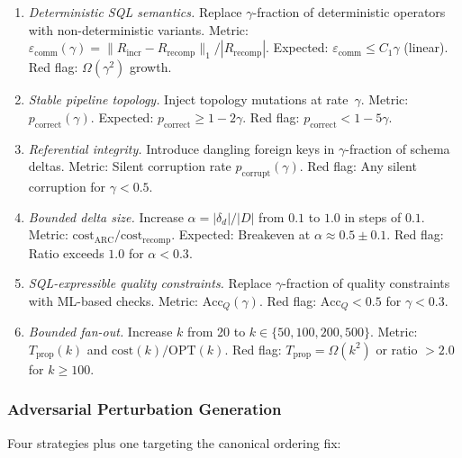 \documentclass[11pt,a4paper]{article}
\theoremstyle{definition}
\newcommand{\cost}{\mathrm{cost}}
\newcommand{\OPT}{\mathrm{OPT}}
\begin{document}
\begin{enumerate}[label=\textbf{A\arabic* ($\gamma$):},leftmargin=*,nosep]
  \item \emph{Deterministic SQL semantics.}
    Replace $\gamma$-fraction of deterministic operators with
    non-deterministic variants.
    Metric: $\varepsilon_{\mathrm{comm}}(\gamma) =
    \|R_{\mathrm{incr}} - R_{\mathrm{recomp}}\|_1 / |R_{\mathrm{recomp}}|$.
    Expected: $\varepsilon_{\mathrm{comm}} \leq C_1 \gamma$ (linear).
    Red flag: $\Omega(\gamma^2)$ growth.

  \item \emph{Stable pipeline topology.}
    Inject topology mutations at rate~$\gamma$.
    Metric: $p_{\mathrm{correct}}(\gamma)$.
    Expected: $p_{\mathrm{correct}} \geq 1 - 2\gamma$.
    Red flag: $p_{\mathrm{correct}} < 1 - 5\gamma$.

  \item \emph{Referential integrity.}
    Introduce dangling foreign keys in $\gamma$-fraction of schema deltas.
    Metric: Silent corruption rate $p_{\mathrm{corrupt}}(\gamma)$.
    Red flag: Any silent corruption for $\gamma < 0.5$.

  \item \emph{Bounded delta size.}
    Increase $\alpha = |\delta_d|/|D|$ from $0.1$ to $1.0$ in steps of $0.1$.
    Metric: $\cost_{\mathrm{ARC}} / \cost_{\mathrm{recomp}}$.
    Expected: Breakeven at $\alpha \approx 0.5 \pm 0.1$.
    Red flag: Ratio exceeds $1.0$ for $\alpha < 0.3$.

  \item \emph{SQL-expressible quality constraints.}
    Replace $\gamma$-fraction of quality constraints with ML-based checks.
    Metric: $\mathrm{Acc}_Q(\gamma)$.
    Red flag: $\mathrm{Acc}_Q < 0.5$ for $\gamma < 0.3$.

  \item \emph{Bounded fan-out.}
    Increase $k$ from 20 to $k \in \{50, 100, 200, 500\}$.
    Metric: $T_{\mathrm{prop}}(k)$ and $\cost(k)/\OPT(k)$.
    Red flag: $T_{\mathrm{prop}} = \Omega(k^2)$ or ratio $> 2.0$ for
    $k \geq 100$.
\end{enumerate}

\subsubsection{Adversarial Perturbation Generation}
\label{sec:adversarial}

Four strategies plus one targeting the canonical ordering fix:
\end{document}
